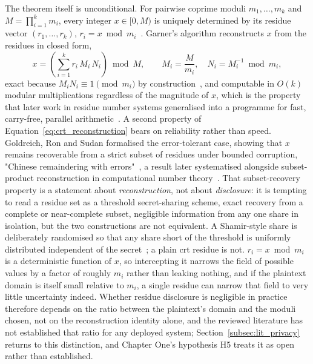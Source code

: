 \documentclass[12pt,a4paper,oneside]{book}
\begin{document}
The theorem itself is unconditional. For pairwise coprime moduli
$m_1,\ldots,m_k$ and $M = \prod_{i=1}^{k} m_i$, every integer
$x \in [0,M)$ is uniquely determined by its residue vector
$(r_1,\ldots,r_k)$, $r_i = x \bmod m_i$~\cite{garner1959residue,
hardy2008introduction}. Garner's algorithm reconstructs $x$ from the
residues in closed form,
\begin{equation}
x = \left( \sum_{i=1}^{k} r_i\, M_i\, N_i \right) \bmod M, \qquad
M_i = \frac{M}{m_i}, \quad N_i = M_i^{-1} \bmod m_i,
\label{eq:crt_reconstruction}
\end{equation}
exact because $M_i N_i \equiv 1 \pmod{m_i}$ by
construction~\cite{garner1959residue, knuth1997art}, and computable in
$O(k)$ modular multiplications regardless of the magnitude of $x$, which is
the property that later work in residue number systems generalised into a
programme for fast, carry-free, parallel
arithmetic~\cite{ding1996remainder, parhami2010computer}. A second
property of Equation~\ref{eq:crt_reconstruction} bears on reliability
rather than speed. Goldreich, Ron and Sudan formalised the error-tolerant
case, showing that $x$ remains recoverable from a strict subset of
residues under bounded corruption, "Chinese remaindering with
errors"~\cite{goldreich1999china}, a result later systematised alongside
subset-product reconstruction in computational number
theory~\cite{shoup2009computational}. That subset-recovery property is a
statement about \emph{reconstruction}, not about \emph{disclosure}: it is
tempting to read a residue set as a threshold secret-sharing scheme, exact
recovery from a complete or near-complete subset, negligible information
from any one share in isolation, but the two constructions are not
equivalent. A Shamir-style share is deliberately randomised so that any
share short of the threshold is uniformly distributed independent of the
secret~\cite{shoup2009computational}; a plain \gls{crt} residue is not.
$r_i = x \bmod m_i$ is a deterministic function of $x$, so intercepting it
narrows the field of possible values by a factor of roughly $m_i$ rather
than leaking nothing, and if the plaintext domain is itself small relative
to $m_i$, a single residue can narrow that field to very little uncertainty
indeed. Whether residue disclosure is negligible in practice therefore
depends on the ratio between the plaintext's domain and the moduli chosen,
not on the reconstruction identity alone, and the reviewed literature has
not established that ratio for any deployed system;
Section~\ref{subsec:lit_privacy} returns to this distinction, and Chapter
One's hypothesis H5 treats it as open rather than established.
\end{document}
